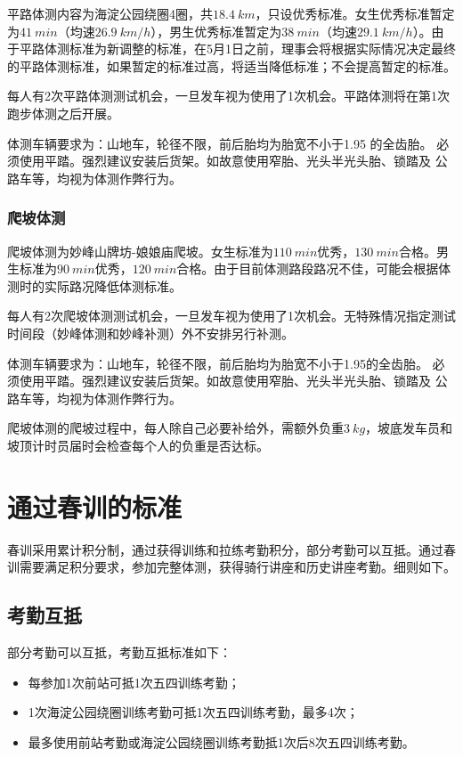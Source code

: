 \documentclass[UTF8]{ctexart}
\begin{document}
平路体测内容为海淀公园绕圈4圈，共$\SI{18.4}{km}$，只设优秀标准。女生优秀标准暂定为$\SI{41}{min}$（均速$\SI{26.9}{km/h}$），男生优秀标准暂定为$\SI{38}{min}$（均速$\SI{29.1}{km/h}$）。由于平路体测标准为新调整的标准，在5月1日之前，理事会将根据实际情况决定最终的平路体测标准，如果暂定的标准过高，将适当降低标准；不会提高暂定的标准。

每人有2次平路体测测试机会，一旦发车视为使用了1次机会。平路体测将在第1次跑步体测之后开展。

体测车辆要求为：山地车，轮径不限，前后胎均为胎宽不小于1.95 的全齿胎。
必须使用平踏。强烈建议安装后货架。如故意使用窄胎、光头半光头胎、锁踏及
公路车等，均视为体测作弊行为。

\subsubsection{爬坡体测}

爬坡体测为妙峰山牌坊-娘娘庙爬坡。女生标准为$\SI{110}{min}$优秀，$\SI{130}{min}$合格。男生标准为$\SI{90}{min}$优秀，$\SI{120}{min}$合格。由于目前体测路段路况不佳，可能会根据体测时的实际路况降低体测标准。

每人有2次爬坡体测测试机会，一旦发车视为使用了1次机会。无特殊情况指定测试时间段（妙峰体测和妙峰补测）外不安排另行补测。

体测车辆要求为：山地车，轮径不限，前后胎均为胎宽不小于1.95的全齿胎。
必须使用平踏。强烈建议安装后货架。如故意使用窄胎、光头半光头胎、锁踏及
公路车等，均视为体测作弊行为。

爬坡体测的爬坡过程中，每人除自己必要补给外，需额外负重$\SI{3}{kg}$，坡底发车员和坡顶计时员届时会检查每个人的负重是否达标。

\section{通过春训的标准}

春训采用累计积分制，通过获得训练和拉练考勤积分，部分考勤可以互抵。通过春训需要满足积分要求，参加完整体测，获得骑行讲座和历史讲座考勤。细则如下。

\subsection{考勤互抵}

部分考勤可以互抵，考勤互抵标准如下：

\begin{itemize}[nosep,left=4em]
    \item 每参加1次前站可抵1次五四训练考勤；
    \item 1次海淀公园绕圈训练考勤可抵1次五四训练考勤，最多4次；
    \item 最多使用前站考勤或海淀公园绕圈训练考勤抵1次后8次五四训练考勤。 
\end{itemize}
\end{document}
